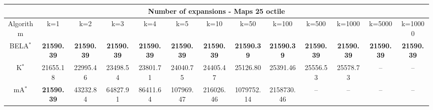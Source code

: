 \begin{tabular}{c|cccccccccccc}\toprule
\multicolumn{13}{c}{Number of expansions - Maps 25 octile}\\ \midrule
Algorithm & k=1 & k=2 & k=3 & k=4 & k=5 & k=10 & k=50 & k=100 & k=500 & k=1000 & k=5000 & k=10000 \\ \midrule
BELA$^*$ & \textbf{21590.39} & \textbf{21590.39} & \textbf{21590.39} & \textbf{21590.39} & \textbf{21590.39} & \textbf{21590.39} & \textbf{21590.39} & \textbf{21590.39} & \textbf{21590.39} & \textbf{21590.39} & \textbf{21590.39} & \textbf{21590.39} \\
K$^*$ & 21655.18 & 22995.46 & 23498.54 & 23801.71 & 24040.75 & 24405.47 & 25126.80 & 25391.46 & 25556.53 & 25578.73 & -- & -- \\
mA$^*$ & \textbf{21590.39} & 43232.84 & 64827.91 & 86411.64 & 107969.47 & 216026.46 & 1079752.14 & 2158730.46 & -- & -- & -- & -- \\ \bottomrule 
\end{tabular}
